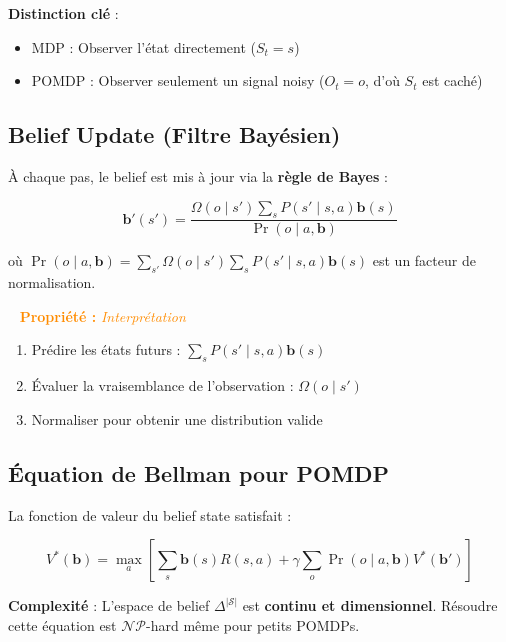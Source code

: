 \documentclass[11pt,a4paper]{article}
\newenvironment{propbox}[1]{%
  \vspace{3pt}\begin{framed}
  \noindent{\color{DarkOrange}\rule{0.3cm}{3pt}}~%
  \textcolor{DarkOrange}{\textbf{Propriété :} \textit{#1}}\\[3pt]}
  {\end{framed}\vspace{3pt}}
\begin{document}
\textbf{Distinction clé} :
\begin{itemize}
  \item MDP : Observer l'état directement ($S_t = s$)
  \item POMDP : Observer seulement un signal noisy ($O_t = o$, d'où $S_t$ est caché)
\end{itemize}

\subsection{Belief Update (Filtre Bayésien)}
 
À chaque pas, le belief est mis à jour via la \textbf{règle de Bayes} :
 
\begin{equation}
\mathbf{b}'(s') = \frac{\Omega(o \mid s') \sum_s P(s' \mid s, a) \mathbf{b}(s)}{\Pr(o \mid a, \mathbf{b})}
\end{equation}
 
où $\Pr(o \mid a, \mathbf{b}) = \sum_{s'} \Omega(o \mid s') \sum_s P(s' \mid s, a) \mathbf{b}(s)$ est un facteur de normalisation.
 
\begin{propbox}{Interprétation}
\begin{enumerate}
  \item Prédire les états futurs : $\sum_s P(s' \mid s, a) \mathbf{b}(s)$
  \item Évaluer la vraisemblance de l'observation : $\Omega(o \mid s')$
  \item Normaliser pour obtenir une distribution valide
\end{enumerate}
\end{propbox}
 
\subsection{Équation de Bellman pour POMDP}
 
La fonction de valeur du belief state satisfait :
 
\begin{equation}
V^*(\mathbf{b}) = \max_a \left[ \sum_s \mathbf{b}(s) R(s,a) + \gamma \sum_o \Pr(o \mid a, \mathbf{b}) V^*(\mathbf{b}') \right]
\end{equation}
 
\textbf{Complexité} : L'espace de belief $\Delta^{|\mathcal{S}|}$ est \textbf{continu et dimensionnel}. Résoudre cette équation est $\mathcal{NP}$-hard même pour petits POMDPs.
\end{document}
